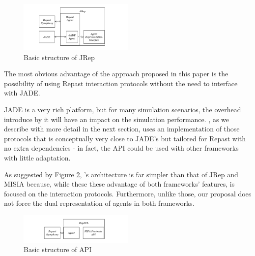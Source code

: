 \begin{figure}[h]
	\centering
	\includegraphics[width=0.5\textwidth]{figures/jrep.png}
	\caption{Basic structure of JRep}
	\label{fig:jrep}
\end{figure}

The most obvious advantage of the approach proposed in this paper is the possibility of using Repast interaction protocols without the need to interface with JADE.

JADE is a very rich platform, but for many simulation scenarios, the overhead introduce by it will have an impact on the simulation performance. \cite{mengistu2008scalability} \apiname{}, as we describe with more detail in the next section, uses an implementation of those protocols that is conceptually very close to JADE's but tailored for Repast with no extra dependencies - in fact, the API could be used with other frameworks with little adaptation.

As suggested by Figure \ref{fig:related-repacl}, \apiname{}'s architecture is far simpler than that of JRep and MISIA because, while these these advantage of both frameworks' features, \apiname{} is focused on the interaction protocols. Furthermore, unlike those, our proposal does not force the dual representation of agents in both frameworks.

\begin{figure}[h]
	\centering
	\includegraphics[width=0.5\textwidth]{figures/repacl.png}
	\caption{Basic structure of \apiname{} API}
	\label{fig:related-repacl}
\end{figure}
